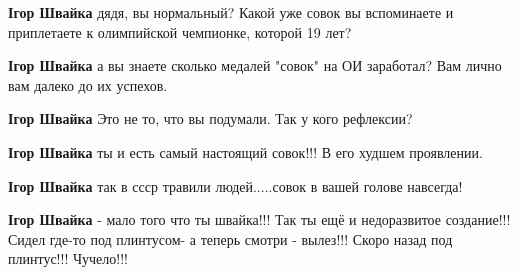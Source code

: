 \begin{itemize}
\begin{itemize}
 
\textbf{Ігор Швайка} дядя, вы нормальный? Какой уже совок вы вспоминаете и приплетаете к олимпийской чемпионке, которой 19 лет?

 
\textbf{Ігор Швайка} а вы знаете сколько медалей "совок" на ОИ заработал? Вам лично вам далеко до их успехов.

 
\textbf{Ігор Швайка} Это не то, что вы подумали.
Так у кого рефлексии?

 
\textbf{Ігор Швайка} ты и есть самый настоящий совок!!! В его худшем проявлении.

 
\textbf{Ігор Швайка} так в ссср травили людей.....совок в вашей голове навсегда!

 
\textbf{Ігор Швайка} - мало того что ты швайка!!! Так ты ещё и недоразвитое создание!!! Сидел где-то под плинтусом- а теперь смотри - вылез!!! Скоро назад под плинтус!!! Чучело!!!


\end{itemize}
\end{itemize}
